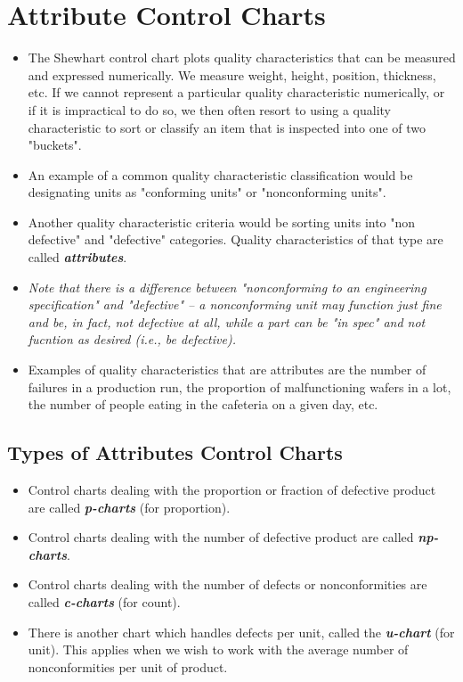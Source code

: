 \documentclass[a4paper,12pt]{article}
\begin{document}
\newpage

\section{Attribute Control Charts}

\begin{itemize}
\item The Shewhart control chart plots quality characteristics that can be measured and expressed numerically. We measure weight, height, position, thickness, etc. If we cannot represent a particular quality characteristic numerically, or if it is impractical to do so, we then often resort to using a quality characteristic to sort or classify an item that is inspected into one of two "buckets".
\item  An example of a common quality characteristic classification would be designating units as "conforming units" or "nonconforming units". 
\item Another quality characteristic criteria would be sorting units into "non defective" and "defective" categories. Quality characteristics of that type are called \textit{\textbf{attributes}}.

\item \textit{Note that there is a difference between "nonconforming to an engineering specification" and "defective" -- a nonconforming unit may function just fine and be, in fact, not defective at all, while a part can be "in spec" and not fucntion as desired (i.e., be defective).}

\item Examples of quality characteristics that are attributes are the number of failures in a production run, the proportion of malfunctioning wafers in a lot, the number of people eating in the cafeteria on a given day, etc.
\end{itemize}
\subsection{Types of Attributes Control Charts}

\begin{itemize}
\item Control charts dealing with the proportion or fraction of defective product are called  \textbf{\textit{p-charts}} (for proportion).
\item Control charts dealing with the number of defective product are called  \textbf{\textit{np-charts}}.
\item Control charts dealing with the number of defects or nonconformities are called \textbf{\textit{c-charts}} (for count).
\item There is another chart which handles defects per unit, called the \textbf{\textit{u-chart}} (for unit). This applies when we wish to work with the average number of nonconformities per unit of product.
\end{itemize}
\end{document}

